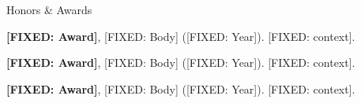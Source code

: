 \documentclass{resume}
\begin{document}

\begin{rSection2}{Honors \& Awards}
\item \textbf{[FIXED: Award]}, [FIXED: Body] ([FIXED: Year]). [FIXED: context].
\item \textbf{[FIXED: Award]}, [FIXED: Body] ([FIXED: Year]). [FIXED: context].
\item \textbf{[FIXED: Award]}, [FIXED: Body] ([FIXED: Year]). [FIXED: context].
\end{rSection2}
\vspace{-0.1cm}


\end{document}
